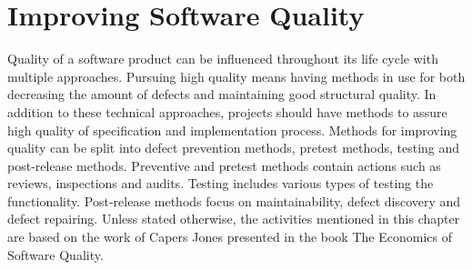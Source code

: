 
 \chapter{Improving Software Quality}
 
Quality of a software product can be influenced throughout its life cycle with multiple approaches. Pursuing high quality means having methods in use for both decreasing the amount of defects and maintaining good structural quality. In addition to these technical approaches, projects should have methods to assure high quality of specification and implementation process. Methods for improving quality can be split into defect prevention methods, pretest methods, testing and post-release methods. Preventive and pretest methods contain actions such as reviews, inspections and audits. Testing includes various types of testing the functionality. Post-release methods focus on maintainability, defect discovery and defect repairing. Unless stated otherwise, the activities mentioned in this chapter are based on the work of Capers Jones presented in the book The Economics of Software Quality.~\cite{jones2011economics}







 

 

 

